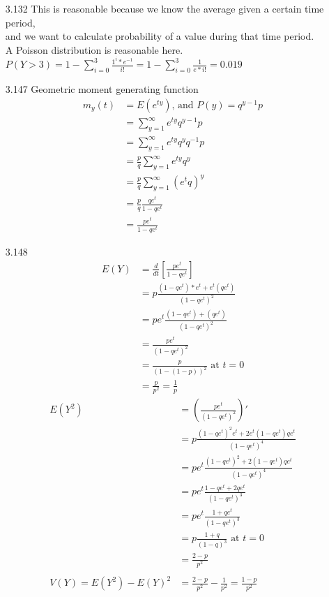 \documentclass[11pt]{article}
\begin{document}
\begin{enumerate}
        \item[3.132] This is reasonable because we know the average given a certain time period, \\
                    and we want to calculate probability of a value during that time period. \\
                    A Poisson distribution is reasonable here. \\
                    $P(Y > 3) = 1 - \sum_{i = 0}^3 \frac{1^i*e^{-1}}{i!} = 1 - \sum_{i = 0}^3 \frac{1}{e*i!} = 0.019$

        \item[3.147] Geometric moment generating function
        \begin{align*}
            m_y(t) &= E(e^{ty}) \text{, and } P(y) = q^{y - 1} p \\
            &= \sum_{y=1}^{\infty} e^{ty}q^{y - 1} p \\
            &= \sum_{y=1}^{\infty} e^{ty}q^y q^{-1} p \\
            &= \frac{p}{q} \sum_{y=1}^{\infty} e^{ty}q^y \\
            &= \frac{p}{q} \sum_{y=1}^{\infty} (e^{t}q)^y \\
            &= \frac{p}{q} \frac{qe^t}{1 - qe^t} \\
            &= \frac{pe^t}{1 - qe^t}
        \end{align*}

        \item[3.148]
        \begin{align*}
            E(Y) &= \frac{d}{dt} [\frac{pe^t}{1 - qe^t}] \\
            &= p \frac{(1-qe^t)*e^t + e^t(qe^t)}{(1 - qe^t)^2} \\
            &= pe^t \frac{(1-qe^t) + (qe^t)}{(1 - qe^t)^2} \\
            &= \frac{pe^t}{(1 - qe^t)^2} \\
            &= \frac{p}{(1 - (1 - p))^2} \text{ at } t = 0 \\
            &= \frac{p}{p^2} = \frac{1}{p}
        \end{align*}
        \begin{align*}
            E(Y^2) &= (\frac{pe^t}{(1 - qe^t)^2})' \\
            &= p \frac{(1 - qe^t)^2 e^t + 2e^t (1-qe^t)qe^t}{(1-qe^t)^4} \\
            &= pe^t \frac{(1 - qe^t)^2 + 2 (1-qe^t)qe^t}{(1-qe^t)^4} \\
            &= pe^t \frac{1 - qe^t + 2qe^t}{(1-qe^t)^3} \\
            &= pe^t \frac{1 + qe^t}{(1-qe^t)^3} \\
            &= p \frac{1 + q}{(1-q)^3} \text{ at } t = 0 \\
            &= \frac{2 - p}{p^2} \\ \\
            V(Y) = E(Y^2) - E(Y)^2 &= \frac{2 - p}{p^2} - \frac{1}{p^2} = \frac{1 - p}{p^2}
        \end{align*}


\end{enumerate}
\end{document}
